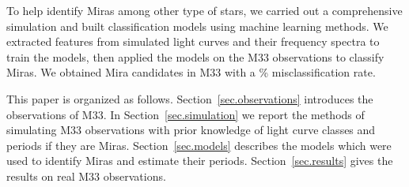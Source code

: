 To help identify Miras among other type of stars, we carried out a comprehensive simulation and built classification models using machine learning methods. We extracted  features from simulated light curves and their frequency spectra to train the models, then applied the models on the M33 observations to classify Miras. We obtained  Mira candidates in M33 with a \% misclassification rate.

This paper is organized as follows. Section~\ref{sec.observations} introduces the observations of M33. In Section~\ref{sec.simulation} we report the methods of simulating M33 observations with prior knowledge of light curve classes and periods if they are Miras. Section~\ref{sec.models} describes the models which were used to identify Miras and estimate their periods. Section~\ref{sec.results} gives the results on real M33 observations.



